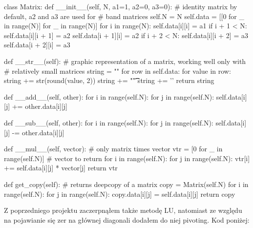 \documentclass{article}
\begin{document}
\begin{python}
class Matrix:
    def __init__(self, N, a1=1, a2=0, a3=0):  
        # identity matrix by default, a2 and a3 are used for 
        # band matrices
        self.N = N
        self.data = [[0 for _ in range(N)] for _ in range(N)]
        for i in range(N):
            self.data[i][i] = a1
            if i + 1 < N:
                self.data[i][i + 1] = a2
                self.data[i + 1][i] = a2
            if i + 2 < N:
                self.data[i][i + 2] = a3
                self.data[i + 2][i] = a3

    def __str__(self):
        # graphic representation of a matrix, working well only with 
        # relatively small matrices
        string = ""
        for row in self.data:
            for value in row:
                string += str(round(value, 2))
                string += "\t\t"
            string += '\n'
        return string

    def __add__(self, other):
        for i in range(self.N):
            for j in range(self.N):
                self.data[i][j] += other.data[i][j]

    def __sub__(self, other):
        for i in range(self.N):
            for j in range(self.N):
                self.data[i][j] -= other.data[i][j]

    def __mul__(self, vector):  # only matrix times vector
        vtr = [0 for _ in range(self.N)]  # vector to return
        for i in range(self.N):
            for j in range(self.N):
                vtr[i] += self.data[i][j] * vector[j]
        return vtr

    def get_copy(self):  # returns deepcopy of a matrix
        copy = Matrix(self.N)
        for i in range(self.N):
            for j in range(self.N):
                copy.data[i][j] = self.data[i][j]
        return copy
\end{python}

Z poprzedniego projektu zaczerpnąłem także metodę LU, natomiast ze względu na pojawianie się zer na głównej diagonali dodałem do niej pivoting. Kod poniżej:
\end{document}
